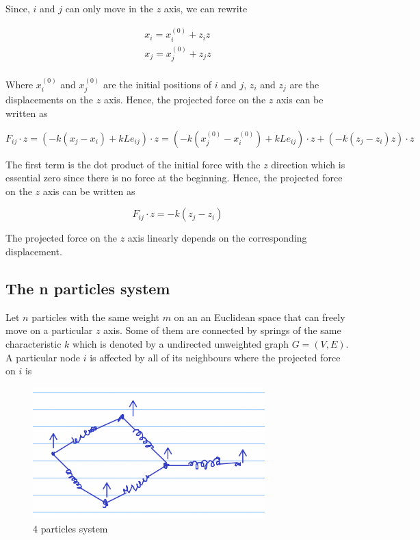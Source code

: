 \documentclass{article}
\begin{document}
    Since, $i$ and $j$ can only move in the $z$ axis, we can rewrite

    \begin{gather*}
        x_i = x_i^{(0)} + z_i z \\
        x_j = x_j^{(0)} + z_j z \\
    \end{gather*}

    Where $x_i^{(0)}$ and $x_j^{(0)}$ are the initial positions of $i$ and $j$, $z_i$ and $z_j$ are the displacements on the $z$ axis. Hence, the projected force on the $z$ axis can be written as

    \begin{equation}
        F_{i j} \cdot z = (- k (x_j - x_i) + k L e_{i j}) \cdot z = (- k (x_j^{(0)} - x_i^{(0)}) + k L e_{i j}) \cdot z + (- k (z_j - z_i) z) \cdot z
    \end{equation}

    The first term is the dot product of the initial force with the $z$ direction which is essential zero since there is no force at the beginning. Hence, the projected force on the $z$ axis can be written as

    \begin{equation}
        F_{i j} \cdot z = - k (z_j - z_i)
    \end{equation}

    The projected force on the $z$ axis linearly depends on the corresponding displacement.

    \subsection{The n particles system}

    Let $n$ particles with the same weight $m$ on an an Euclidean space that can freely move on a particular $z$ axis. Some of them are connected by springs of the same characteristic $k$ which is denoted by a undirected unweighted graph $G = (V, E)$. A particular node $i$ is affected by all of its neighbours where the projected force on $i$ is

    \begin{figure}[h!]
        \centering
        \includegraphics[width=0.8\textwidth]{fig2.png}
        \caption{4 particles system}
        \label{fig:fig2}
    \end{figure}
\end{document}
